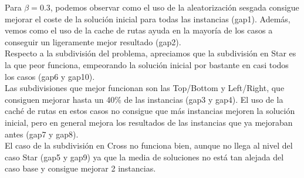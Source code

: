 \documentclass[11pt]{article} %
\begin{document}
\begin{enumerate}
Para $\beta = 0.3$, podemos observar como el uso de la aleatorización sesgada consigue mejorar el coste de la solución inicial para todas las instancias (gap1). Además, vemos como el uso de la cache de rutas ayuda en la mayoría de los casos a conseguir un ligeramente mejor resultado (gap2).\\
Respecto a la subdivisión del problema, apreciamos que la subdivisión en Star es la que peor funciona, empeorando la solución inicial por bastante en casi todos los casos (gap6 y gap10). \\
Las subdivisiones que mejor funcionan son las Top/Bottom y Left/Right, que consiguen mejorar hasta un 40\% de las instancias (gap3 y gap4). El uso de la caché de rutas en estos casos no consigue que más instancias mejoren la solución inicial, pero en general mejora los resultados de las instancias que ya mejoraban antes (gap7 y gap8).\\
El caso de la subdivisión en Cross no funciona bien, aunque no llega al nivel del caso Star (gap5 y gap9) ya que la media de soluciones no está tan alejada del caso base y consigue mejorar 2 instancias.

\clearpage


\end{enumerate}
\end{document}
